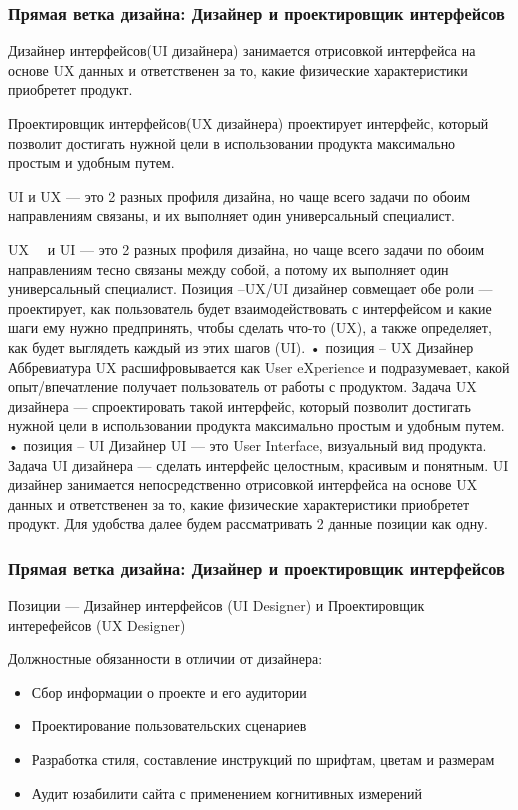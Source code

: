 \documentclass{../industrial-development}
\begin{document}
{\begin{frame} \frametitle{Прямая ветка дизайна: Дизайнер и проектировщик интерфейсов }
 \begin{block}{}
 Дизайнер интерфейсов(UI дизайнера) занимается  отрисовкой интерфейса на основе UX данных и ответственен за то, какие физические характеристики приобретет продукт.
  \end{block}
 \begin{block}{}
Проектировщик интерфейсов(UX дизайнера) проектирует интерфейс, который позволит достигать нужной цели в использовании продукта максимально простым и удобным путем.
  \end{block}
   \begin{block}{}
 UI и UX  --- это 2 разных профиля дизайна, но чаще всего задачи по обоим направлениям связаны, и их выполняет один универсальный специалист.
  \end{block}
\end{frame}

\lecturenotes
UX~\cite{hh}~\cite{itcf}  и UI — это 2 разных профиля дизайна, но чаще всего задачи по обоим направлениям тесно связаны между собой, а потому их выполняет один универсальный специалист.
Позиция –UX/UI дизайнер совмещает обе роли — проектирует, как пользователь будет взаимодействовать с интерфейсом и какие шаги ему нужно предпринять, чтобы сделать что-то (UX), а также определяет, как будет выглядеть каждый из этих шагов (UI).
•	позиция – UX Дизайнер
Аббревиатура UX расшифровывается как User eXperience и подразумевает, какой опыт/впечатление получает пользователь от работы с продуктом. Задача UX дизайнера — спроектировать такой интерфейс, который позволит достигать нужной цели в использовании продукта максимально простым и удобным путем.
•	позиция – UI Дизайнер
UI — это User Interface, визуальный вид продукта. Задача UI дизайнера — сделать интерфейс целостным, красивым и понятным. UI дизайнер занимается непосредственно отрисовкой интерфейса на основе UX данных и ответственен за то, какие физические характеристики приобретет продукт.
Для удобства далее будем рассматривать 2 данные позиции как одну.

\begin{frame} \frametitle{Прямая ветка дизайна: Дизайнер и проектировщик интерфейсов }
 \begin{block}{}
  \alert{Позиции --- Дизайнер интерфейсов (UI Designer) и Проектировщик интерефейсов (UX Designer)}

Должностные обязанности в отличии от дизайнера: 
  \end{block}
  \begin{itemize}
  \item   Сбор информации о проекте и его аудитории
  \item  Проектирование пользовательских сценариев
  \item Разработка стиля, составление инструкций по шрифтам, цветам и размерам
 \item Аудит юзабилити сайта с применением когнитивных измерений
  \end{itemize}
\end{frame}

}
\end{document}
